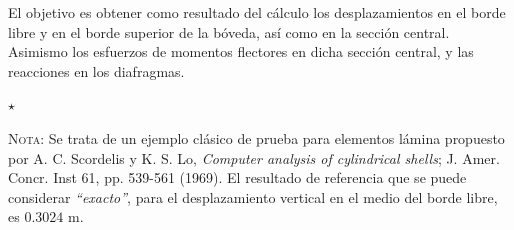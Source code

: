 \documentclass[a4paper,12pt]{article}
\begin{document}
El objetivo es obtener como resultado del cálculo los desplazamientos en el borde libre y en el borde superior de la bóveda, así como en la sección central. Asimismo los esfuerzos de momentos flectores en dicha sección central, y las reacciones en los diafragmas.

\vspace{20mm}

\hspace{20mm}\hrulefill$\star$\hrulefill\hspace{20mm}

{\small
\textsc{Nota:} Se trata de un ejemplo clásico de prueba para elementos lámina propuesto por A. C. Scordelis y K. S. Lo, \emph{Computer analysis of cylindrical shells}; J. Amer. Concr. Inst 61, pp. 539-561 (1969).
El resultado de referencia que se puede considerar \emph{``exacto''}, para el desplazamiento vertical en el medio del borde libre, es $0.3024$ m.
}


\end{document}
